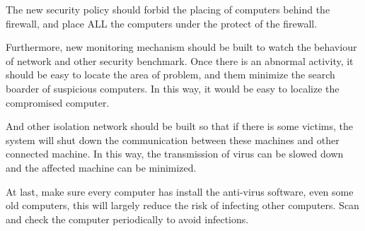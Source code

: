 \documentclass{article}
\begin{document}
The new security policy should forbid the placing of computers behind the firewall, and place ALL the computers under the protect of the firewall.

Furthermore, new monitoring mechanism should be built to watch the behaviour of network and other security benchmark. Once there is an abnormal
activity, it should be easy to locate the area of problem, and them minimize the search boarder of suspicious computers. In this way, it would
be easy to localize the compromised computer.

And other isolation network should be built so that if there is some victims, the system will shut down the communication between these machines
and other connected machine. In this way, the transmission of virus can be slowed down and the affected machine can be minimized.

At last, make sure every computer has install the anti-virus software, even some old computers, this will largely reduce the risk of infecting other computers. Scan and check the computer periodically to avoid infections.
\end{document}
